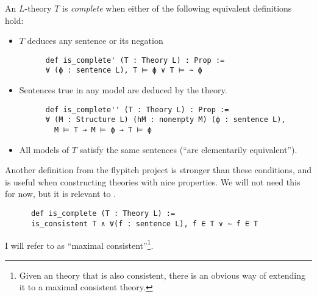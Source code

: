 \begin{dfn}
    An $L$-theory $T$ is \textit{complete}
    when either of the following equivalent definitions hold:
    \begin{itemize}
      \item  $T$ deduces any sentence or its negation
    \begin{lstlisting}
      def is_complete' (T : Theory L) : Prop :=
      ∀ (ϕ : sentence L), T ⊨ ϕ ∨ T ⊨ ∼ ϕ \end{lstlisting}
      \item Sentences true in any model are deduced by the theory.
    \begin{lstlisting}
      def is_complete'' (T : Theory L) : Prop :=
      ∀ (M : Structure L) (hM : nonempty M) (ϕ : sentence L),
        M ⊨ T → M ⊨ ϕ → T ⊨ ϕ \end{lstlisting}
      \item All models of $T$ satisfy the same sentences
            (``are elementarily equivalent'').
    \end{itemize}

    Another definition  from the flypitch project
    is stronger than these conditions, and is useful when constructing
    theories with nice properties.
    We will not need this for now, but it is relevant to .
    \begin{lstlisting}
      def is_complete (T : Theory L) :=
      is_consistent T ∧ ∀(f : sentence L), f ∈ T ∨ ∼ f ∈ T \end{lstlisting}
    I will refer to  as ``maximal consistent''\footnote{
      Given an  theory that is also consistent,
      there is an obvious way of extending it to a maximal consistent theory.}.
\end{dfn}

